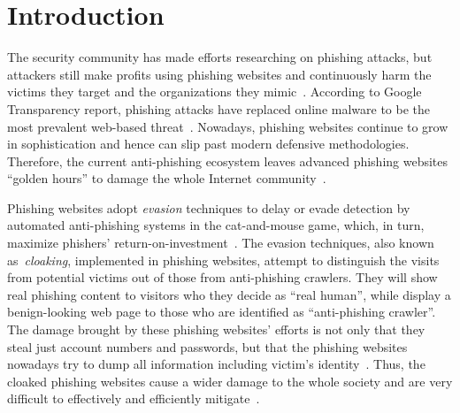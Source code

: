 \section{Introduction}

The security community has made efforts researching on phishing attacks,
but attackers still make profits using phishing websites and continuously harm the victims they target and the organizations they mimic~\cite{ho2019detecting, van2019cognitive}.
According to Google Transparency report, phishing attacks have replaced online malware to be the most prevalent web-based threat~\cite{googletransparencyreport, solutions2019verizon}.
Nowadays, phishing websites continue to grow in sophistication and hence can slip past modern defensive methodologies.
Therefore, the current anti-phishing ecosystem leaves advanced phishing websites ``golden hours'' to damage the whole Internet community~\cite{oest2020sunrise}.

Phishing websites adopt \emph{evasion} techniques to delay or evade detection by automated anti-phishing systems in the cat-and-mouse game,
which, in turn, maximize phishers' return-on-investment~\cite{thomas2017data}.
The evasion techniques, also known as~\emph{cloaking}, implemented in phishing websites, attempt to distinguish the visits from potential victims out of those from anti-phishing crawlers.
They will show real phishing content to visitors who they decide as ``real human'', while display a benign-looking web page to those who are identified as ``anti-phishing crawler''.
The damage brought by these phishing websites' efforts is not only that they steal just account numbers and passwords,
but that the phishing websites nowadays try to dump all information including victim's identity~\cite{thomas2017data}.
Thus, the cloaked phishing websites cause a wider damage to the whole society and are very difficult to effectively and efficiently mitigate~\cite{oest2020sunrise, zhang2021crawlphish}.

